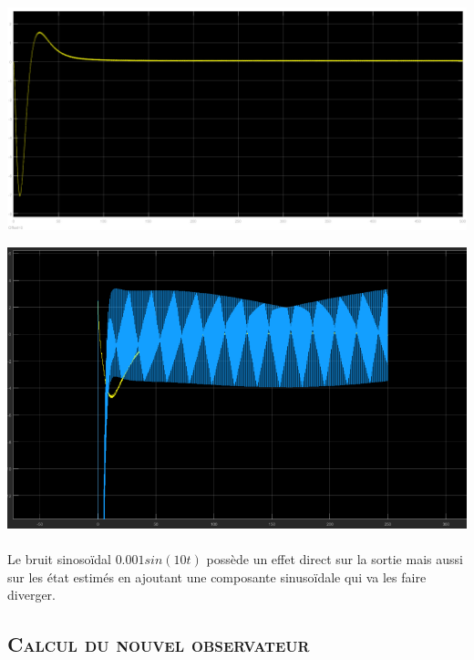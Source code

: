 		\begin{center}
		\includegraphics[scale=0.4]{bruit.png} 
		\label{fig8}
		\end{center}		
	    
		\begin{center}
		\includegraphics[scale=0.5]{chap5.png} 
		\label{fig9}
		\end{center}		    
	    
	    \paragraph{} Le bruit sinosoïdal $0.001 sin(10t)$ possède un effet direct sur la sortie mais aussi sur les état estimés en ajoutant une composante sinusoïdale qui va les faire diverger. 
	    
	    \subsection{\textsc {Calcul du nouvel observateur}}
	    
